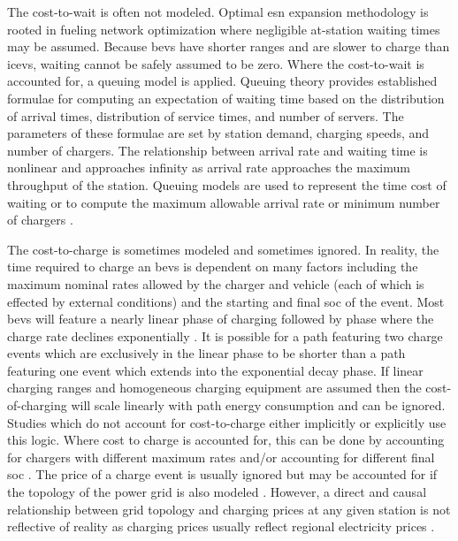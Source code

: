 The cost-to-wait is often not modeled. Optimal \gls{esn} expansion methodology is rooted in fueling network optimization where negligible at-station waiting times may be assumed. Because \glspl{bev} have shorter ranges and are slower to charge than \glspl{icev}, waiting cannot be safely assumed to be zero. Where the cost-to-wait is accounted for, a queuing model is applied. Queuing theory provides established formulae for computing an expectation of waiting time based on the distribution of arrival times, distribution of service times, and number of servers. The parameters of these formulae are set by station demand, charging speeds, and number of chargers. The relationship between arrival rate and waiting time is nonlinear and approaches infinity as arrival rate approaches the maximum throughput of the station. Queuing models are used to represent the time cost of waiting \citep{Zhu_2018_jssse, Tian_2018_s, Yi_2019_e, Wang_2022_er, Vijay_2024_es, Pourvaziri_2024_tre} or to compute the maximum allowable arrival rate or minimum number of chargers \citep{Xiao_2020_jes, Wu_2024_trd}.

The cost-to-charge is sometimes modeled and sometimes ignored. In reality, the time required to charge an \glspl{bev} is dependent on many factors including the maximum nominal rates allowed by the charger and vehicle (each of which is effected by external conditions) and the starting and final \gls{soc} of the event. Most \glspl{bev} will feature a nearly linear phase of charging followed by phase where the charge rate declines exponentially \citep{Marra_2012}. It is possible for a path featuring two charge events which are exclusively in the linear phase to be shorter than a path featuring one event which extends into the exponential decay phase. If linear charging ranges and homogeneous charging equipment are assumed then the cost-of-charging will scale linearly with path energy consumption and can be ignored. Studies which do not account for cost-to-charge  either implicitly or explicitly use this logic. Where cost to charge is accounted for, this can be done by accounting for chargers with different maximum rates and/or accounting for different final \gls{soc} \citep{Davatgari_2024_ejor, Yuvaraj_2024_ia, Zhu_2018_jssse, Upchurch_2009_ga, Zhang_2023_ijpr, Tian_2018_s, Vijay_2024_es, Wang_2022_er, Wu_2024_trd}. The price of a charge event is usually ignored but may be accounted for if the topology of the power grid is also modeled \citep{Yuvaraj_2024_ia, Gupta_2023_jes, Vijay_2024_es, Yi_2019_e}. However, a direct and causal relationship between grid topology and charging prices at any given station is not reflective of reality as charging prices usually reflect regional electricity prices \cite{Trinko_2021}.

